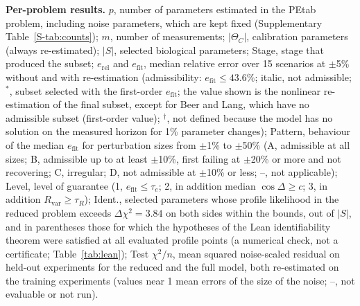 \documentclass[pdflatex,sn-nature]{sn-jnl}
\theoremstyle{plain}
\begin{document}
\clearpage
\begin{table}[!htbp]
\caption{\textbf{Per-problem results.} $p$, number of parameters estimated in the PEtab problem, including noise parameters, which are kept fixed (Supplementary Table~\ref{S-tab:counts}); $m$, number of measurements; $|\Theta_C|$, calibration parameters (always re-estimated); $|S|$, selected biological parameters; Stage, stage that produced the subset; $e_{\mathrm{rel}}$ and $e_{\mathrm{fit}}$, median relative error over 15 scenarios at $\pm$5\% without and with re-estimation (admissibility: $e_{\mathrm{fit}}\le 43.6\%$; italic, not admissible; $^{\ast}$, subset selected with the first-order $e_{\mathrm{fit}}$; the value shown is the nonlinear re-estimation of the final subset, except for Beer and Lang, which have no admissible subset (first-order value); $^{\dagger}$, not defined because the model has no solution on the measured horizon for 1\% parameter changes); Pattern, behaviour of the median $e_{\mathrm{fit}}$ for perturbation sizes from $\pm$1\% to $\pm$50\% (A, admissible at all sizes; B, admissible up to at least $\pm$10\%, first failing at $\pm$20\% or more and not recovering; C, irregular; D, not admissible at $\pm$10\% or less; --, not applicable); Level, level of guarantee (1, $e_{\mathrm{fit}}\le\tau_e$; 2, in addition median $\cos\Delta\ge c$; 3, in addition $R_{\mathrm{var}}\ge\tau_R$); Ident., selected parameters whose profile likelihood in the reduced problem exceeds $\Delta\chi^2=3.84$ on both sides within the bounds, out of $|S|$, and in parentheses those for which the hypotheses of the Lean identifiability theorem were satisfied at all evaluated profile points (a numerical check, not a certificate; Table~\ref{tab:lean}); Test $\chi^2/n$, mean squared noise-scaled residual on held-out experiments for the reduced and the full model, both re-estimated on the training experiments (values near 1 mean errors of the size of the noise; --, not evaluable or not run).}
\label{tab:benchmark}
\centering
\scriptsize
\setlength{\tabcolsep}{1.2pt}

\end{table}
\clearpage
\end{document}
